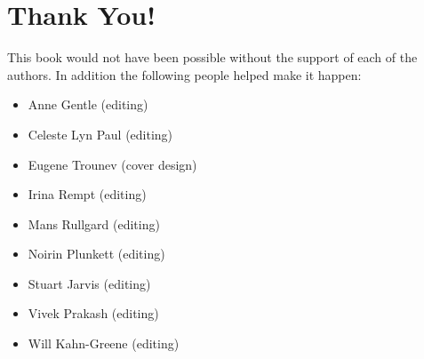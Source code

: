 \section*{Thank You!}

This book would not have been possible without the support of each of the
authors. In addition the following people helped make it happen:
\begin{itemize}
 \item Anne Gentle (editing)
 \item Celeste Lyn Paul (editing)
 \item Eugene Trounev (cover design)
 \item Irina Rempt (editing)
 \item Mans Rullgard (editing)
 \item Noirin Plunkett (editing)
 \item Stuart Jarvis (editing)
 \item Vivek Prakash (editing)
 \item Will Kahn-Greene (editing)
\end{itemize}

\newpage